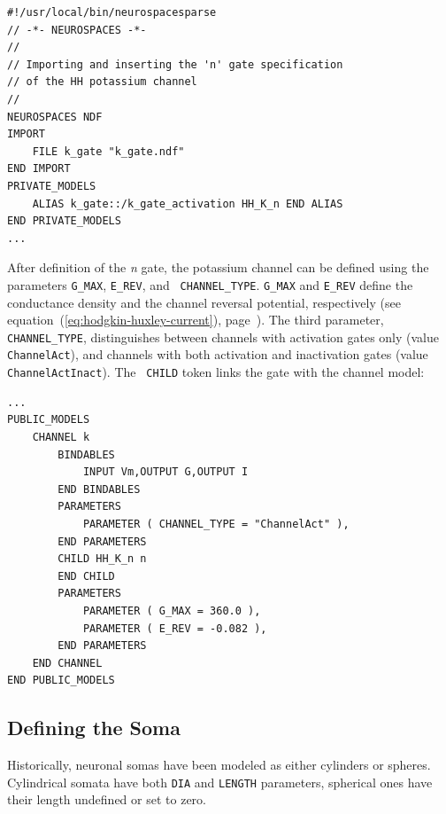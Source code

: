 \documentclass[12pt]{article}
\begin{document}
\begin{verbatim}
#!/usr/local/bin/neurospacesparse
// -*- NEUROSPACES -*-
//
// Importing and inserting the 'n' gate specification
// of the HH potassium channel
//
NEUROSPACES NDF
IMPORT
    FILE k_gate "k_gate.ndf"
END IMPORT
PRIVATE_MODELS
    ALIAS k_gate::/k_gate_activation HH_K_n END ALIAS
END PRIVATE_MODELS
...
\end{verbatim}

After definition of the {\it n} gate, the potassium channel can be defined
using the parameters {\tt G\_MAX}, {\tt E\_REV}, and {\tt
  CHANNEL\_TYPE}.  {\tt G\_MAX} and {\tt E\_REV} define the
conductance density and the channel reversal potential, respectively
(see equation~(\ref{eq:hodgkin-huxley-current}),
page~\pageref{eq:hodgkin-huxley-current}).  The third parameter, {\tt
  CHANNEL\_TYPE}, distinguishes between channels with activation gates
only (value {\tt ChannelAct}), and channels with both activation
and inactivation gates (value {\tt ChannelActInact}).  The {\tt
  CHILD} token links the gate with the channel model:

\begin{verbatim}
...
PUBLIC_MODELS
    CHANNEL k
        BINDABLES
            INPUT Vm,OUTPUT G,OUTPUT I
        END BINDABLES
        PARAMETERS
            PARAMETER ( CHANNEL_TYPE = "ChannelAct" ),
        END PARAMETERS
        CHILD HH_K_n n
        END CHILD
        PARAMETERS
            PARAMETER ( G_MAX = 360.0 ),
            PARAMETER ( E_REV = -0.082 ),
        END PARAMETERS
    END CHANNEL
END PUBLIC_MODELS
\end{verbatim}

\subsection{Defining the Soma}
\label{sec:defining-soma}

Historically, neuronal somas have been modeled as either cylinders or
spheres.  Cylindrical somata have both {\tt DIA} and {\tt LENGTH}
parameters, spherical ones have their length undefined or set to zero.
\end{document}
